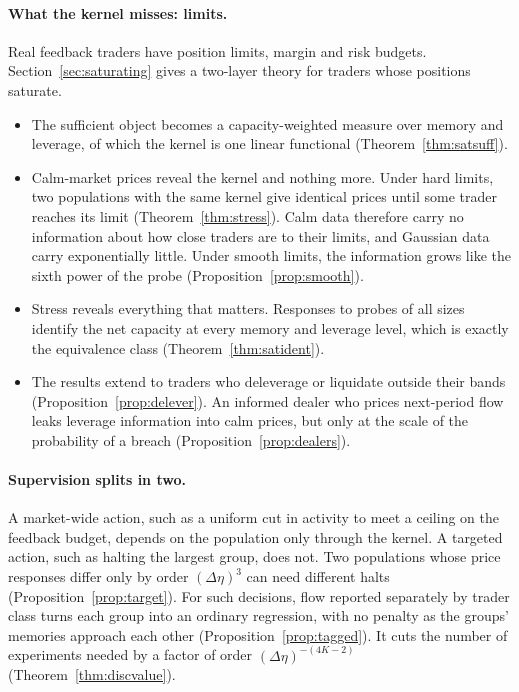 \paragraph{What the kernel misses: limits.} Real feedback traders have position limits, margin and risk budgets. Section~\ref{sec:saturating} gives a two-layer theory for traders whose positions saturate.
\begin{itemize}[itemsep=1pt,topsep=2pt]
\item The sufficient object becomes a capacity-weighted measure over memory and leverage, of which the kernel is one linear functional (Theorem~\ref{thm:satsuff}).
\item Calm-market prices reveal the kernel and nothing more. Under hard limits, two populations with the same kernel give identical prices until some trader reaches its limit (Theorem~\ref{thm:stress}). Calm data therefore carry no information about how close traders are to their limits, and Gaussian data carry exponentially little. Under smooth limits, the information grows like the sixth power of the probe (Proposition~\ref{prop:smooth}).
\item Stress reveals everything that matters. Responses to probes of all sizes identify the net capacity at every memory and leverage level, which is exactly the equivalence class (Theorem~\ref{thm:satident}).
\item The results extend to traders who deleverage or liquidate outside their bands (Proposition~\ref{prop:delever}). An informed dealer who prices next-period flow leaks leverage information into calm prices, but only at the scale of the probability of a breach (Proposition~\ref{prop:dealers}).
\end{itemize}

\paragraph{Supervision splits in two.} A market-wide action, such as a uniform cut in activity to meet a ceiling on the feedback budget, depends on the population only through the kernel. A targeted action, such as halting the largest group, does not. Two populations whose price responses differ only by order $(\Delta\eta)^3$ can need different halts (Proposition~\ref{prop:target}). For such decisions, flow reported separately by trader class turns each group into an ordinary regression, with no penalty as the groups' memories approach each other (Proposition~\ref{prop:tagged}). It cuts the number of experiments needed by a factor of order $(\Delta\eta)^{-(4K-2)}$ (Theorem~\ref{thm:discvalue}).

